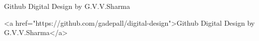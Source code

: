 Github Digital Design by G.V.V.Sharma

<a href="https://github.com/gadepall/digital-design">Github Digital Design by G.V.V.Sharma</a>

